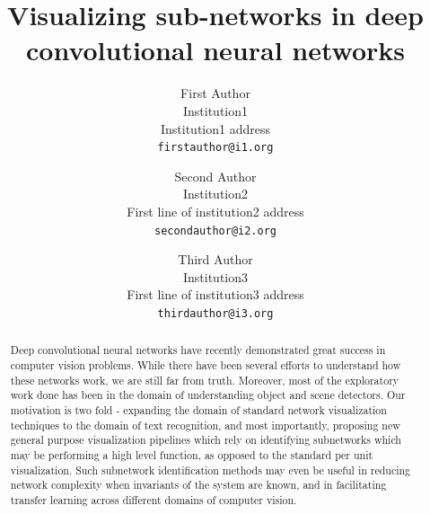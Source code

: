 \documentclass[10pt,twocolumn,letterpaper]{article}
\begin{document}
\title{Visualizing sub-networks in deep convolutional neural networks}


\author{First Author\\
Institution1\\
Institution1 address\\
{\tt\small firstauthor@i1.org}
\and
Second Author\\
Institution2\\
First line of institution2 address\\
{\tt\small secondauthor@i2.org}
\and
Third Author\\
Institution3\\
First line of institution3 address\\
{\tt\small thirdauthor@i3.org}
}


\maketitle


\begin{abstract}
  Deep convolutional neural networks have recently demonstrated great success in computer vision problems. While there have been several efforts to understand how these networks work, we are still far from truth. Moreover, most of the exploratory work done has been in the domain of understanding object and scene detectors. Our motivation is two fold - expanding the domain of standard network visualization techniques to the domain of text recognition, and most importantly, proposing new general purpose visualization pipelines which rely on identifying subnetworks which may be performing a high level function, as opposed to the standard per unit visualization. Such subnetwork identification methods may even be useful in reducing network complexity when invariants of the system are known, and in facilitating transfer learning across different domains of computer vision.
\end{abstract}


\end{document}
